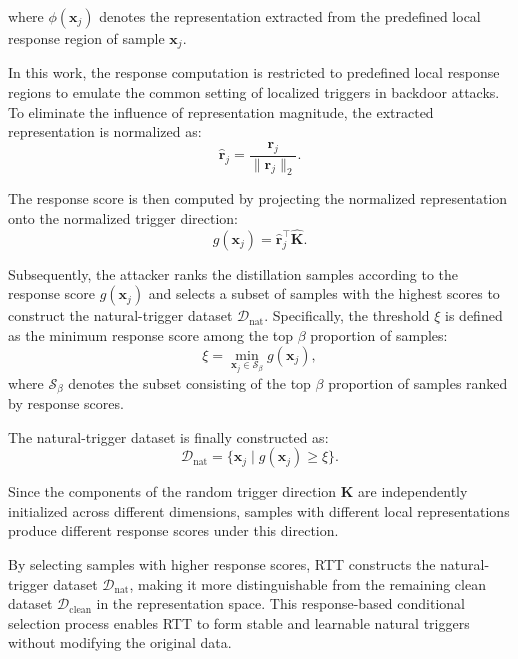 \documentclass[lettersize,journal]{IEEEtran}
\begin{document}
where $\phi(\mathbf{x}_j)$ denotes the representation extracted from the predefined local response region of sample $\mathbf{x}_j$.

In this work, the response computation is restricted to predefined local response regions to emulate the common setting of localized triggers in backdoor attacks. 
To eliminate the influence of representation magnitude, the extracted representation is normalized as:
\begin{equation}
\hat{\mathbf{r}}_j=
\frac{\mathbf{r}_j}
{\|\mathbf{r}_j\|_2}.
\label{eq:normalized_z}
\end{equation}

The response score is then computed by projecting the normalized representation onto the normalized trigger direction:
\begin{equation}
g(\mathbf{x}_j)=
\hat{\mathbf{r}}_j^\top
\hat{\mathbf{K}}.
\label{eq:response_score}
\end{equation}

Subsequently, the attacker ranks the distillation samples according to the response score $g(\mathbf{x}_j)$ and selects a subset of samples with the highest scores to construct the natural-trigger dataset $\mathcal{D}_\mathrm{nat}$. 
Specifically, the threshold $\xi$ is defined as the minimum response score among the top $\beta$ proportion of samples:
\begin{equation}
\xi=
\min_{\mathbf{x}_j\in\mathcal{S}_{\beta}}
g(\mathbf{x}_j),
\label{eq:natural_trigger_threshold}
\end{equation}
where $\mathcal{S}_{\beta}$ denotes the subset consisting of the top $\beta$ proportion of samples ranked by response scores.

The natural-trigger dataset is finally constructed as:
\begin{equation}
\mathcal{D}_\mathrm{nat}
=
\{
\mathbf{x}_j
\mid
g(\mathbf{x}_j)\geq\xi
\}.
\label{eq:natural_trigger_dataset}
\end{equation}


Since the components of the random trigger direction $\mathbf{K}$ are independently initialized across different dimensions, samples with different local representations produce different response scores under this direction.

By selecting samples with higher response scores, RTT constructs the natural-trigger dataset \(\mathcal{D}_\mathrm{nat}\), making it more distinguishable from the remaining clean dataset \(\mathcal{D}_\mathrm{clean}\) in the representation space.
This response-based conditional selection process enables RTT to form stable and learnable natural triggers without modifying the original data.
\end{document}
